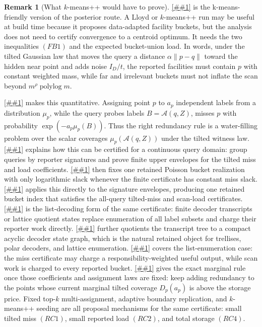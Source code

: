 \documentclass[10pt]{article}
\newcommand{\Cref}[1]{\ref{##1}}
\theoremstyle{definition}
\newtheorem{remark}[theorem]{Remark}
\newcommand{\polylog}{\operatorname{polylog}}
\begin{document}
\begin{remark}[What \(k\)-means++ would have to prove]
   \label{rem:kmeanspp-facility-target}
   \Cref{cor:facility-bucket-witness} is the k-means-friendly version of the
   posterior route.  A Lloyd or \(k\)-means++ run \cite{AV07} may be useful at
   build time because it proposes data-adapted facility buckets, but the
   analysis does not need to certify convergence to a centroid optimum.  It
   needs the two inequalities \((FB1)\) and the expected bucket-union load.  In
   words, under the tilted Gaussian law that moves the query a distance
   \(\alpha\|p-q\|\) toward the hidden near point and adds noise
   \(I_D/t\), the reported facilities must contain \(p\) with constant
   weighted mass, while far and irrelevant buckets must not inflate the scan
   beyond \(m^\rho\polylog m\).

   \Cref{lem:poisson-rate-coverage} makes this quantitative.  Assigning point
   \(p\) to \(a_p\) independent labels from a distribution \(\mu_p\), while the
   query probes labels \(B=\mathcal A(q,Z)\), misses \(p\) with probability
   \(\exp(-a_p\mu_p(B))\).  Thus the right redundancy rule is a water-filling
   problem over the scalar coverages \(\mu_p(\mathcal A(q,Z))\) under the
   tilted witness law.  \Cref{lem:finite-signature-rate-coverage} explains how
   this can be certified for a continuous query domain: group queries by
   reporter signatures and prove finite upper envelopes for the tilted miss and
   load coefficients.  \Cref{lem:finite-poisson-rate-coverage-realization}
   then fixes one retained Poisson bucket realization with only logarithmic
   slack whenever the finite certificate has constant miss slack.
   \Cref{cor:finite-signature-retained-buckets} applies this directly to the
   signature envelopes, producing one retained bucket index that satisfies the
   all-query tilted-miss and scan-load certificates.
   \Cref{cor:finite-transcript-rate-coverage} is the
   list-decoding form of the same certificate: finite decoder transcripts or
   lattice quotient states replace enumeration of all label subsets and charge
   their reporter work directly.  \Cref{cor:compressed-decoder-dag-rate-coverage}
   further quotients the transcript tree to a compact acyclic decoder state
   graph, which is the natural retained object for trellises, polar decoders,
   and lattice enumeration.  \Cref{cor:output-sensitive-decoder-dag-rate-coverage}
   covers the list-enumeration case: the miss certificate may charge a
   responsibility-weighted useful output, while scan work is charged to every
   reported bucket.  \Cref{lem:scalar-redundancy-waterfill} gives the exact
   marginal rule once those coefficients and assignment laws are fixed: keep
   adding redundancy to the points whose current marginal tilted coverage
   \(D_p(a_p)\) is above the storage price.  Fixed top-\(k\) multi-assignment,
   adaptive boundary replication, and \(k\)-means++ seeding are all proposal
   mechanisms for the same certificate: small tilted miss \((RC1)\), small
   reported load \((RC2)\), and total storage \((RC4)\).


\end{remark}
\end{document}
